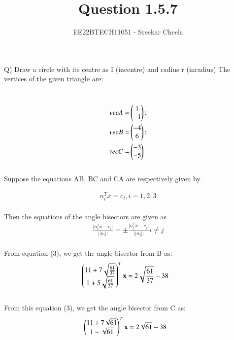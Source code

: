 \documentclass[journal,12pt,twocolumn]{IEEEtran}
\theoremstyle{remark}
\begin{document}
%




\vspace{3cm}

\title{
Question 1.5.7
}
\author{ EE22BTECH11051 - Sreekar Cheela 
}	

\maketitle

\newpage


\begin{flushleft}
	\large Q) Draw a circle with its centre as I (incentre) and radius r (inradius)
	\bigskip
	\large The vertices of the given triangle are:
\end{flushleft}
\\
\begin{align}
	vec {A}= &\begin{pmatrix}1\\-1\end{pmatrix};\\ vec {B}= &\begin{pmatrix}-4\\6\end{pmatrix};\\ vec {C}= &\begin{pmatrix}-3\\-5\end{pmatrix}	
\end{align}
\\
Suppose the equations AB, BC and CA are respectively given by

 \large \begin{align}
    n_{i}^{T} x = c_i , i = 1,2,3
    \end{align}
\\
Then the equations of the angle bisectors are given as 
\\
\begin{align}
     \frac{\lvert n_{i}^{T} x - c_i  \rvert}{\lvert \lvert n_{i} \rvert \rvert} = \pm 
	 \frac{\lvert n_{j}^{T} x - c_j  \rvert}{\lvert \lvert n_{j} \rvert \rvert}
	 i \neq j
\end{align}
 \\
\bigskip 
 From equation (3), we get the angle bisector from B as:
\begin{align}
	&\begin{pmatrix}
        11 + 7\sqrt{\frac{61}{37}} \\
        1 + 5\sqrt{\frac{61}{37}}			
			\end{pmatrix}^{T}
			\mathbf {x} = 2\sqrt{\frac{61}{37}}-38
\end{align}   
\\
 From this equation (3), we get the angle bisector from C as:
\\
\begin{align}
	&\begin{pmatrix}
		11 + 7\sqrt{61} \\
    	1 - \sqrt{61}
		   \end{pmatrix}^{T}
		   \mathbf {x} = 2\sqrt{61}-38
\end{align}
\end{document}
